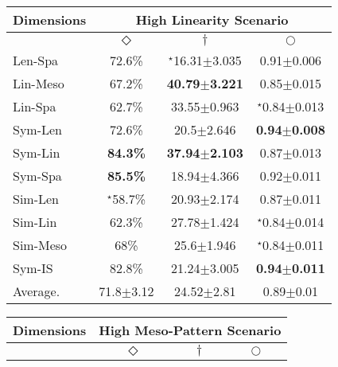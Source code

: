 \begin{table*}
\begin{subtable}[t]{0.48\textwidth}
\centering
\begin{tabular}{|l|ccc|}
\hline
Dimensions & \multicolumn{3}{c|}{High Linearity Scenario}                                  \\ \hline
        & \multicolumn{1}{c|}{$\Diamond$} & \multicolumn{1}{c|}{$\dagger$} & \multicolumn{1}{c|}{$\bigcirc$} \\ \hline
Len-Spa    & 72.6\%             & $^{\star}${16.31$\pm$3.035} & 0.91$\pm$0.006             \\ \hline
Lin-Meso   & 67.2\%             & \textbf{40.79$\pm$3.221}    & 0.85$\pm$0.015             \\ \hline
Lin-Spa    & 62.7\%             & 33.55$\pm$0.963             & $^{\star}${0.84$\pm$0.013} \\ \hline
Sym-Len    & 72.6\%             & 20.5$\pm$2.646              & \textbf{0.94$\pm$0.008}    \\ \hline
Sym-Lin & \textbf{84.3\%}                 & \textbf{37.94$\pm$2.103}       & 0.87$\pm$0.013                  \\ \hline
Sym-Spa    & \textbf{85.5\%}    & 18.94$\pm$4.366             & 0.92$\pm$0.011             \\ \hline
Sim-Len    & $^{\star}${58.7\%} & 20.93$\pm$2.174             & 0.87$\pm$0.011             \\ \hline
Sim-Lin    & 62.3\%             & 27.78$\pm$1.424             & $^{\star}${0.84$\pm$0.014} \\ \hline
Sim-Meso   & 68\%               & 25.6$\pm$1.946              & $^{\star}${0.84$\pm$0.011} \\ \hline
Sym-IS     & 82.8\%             & 21.24$\pm$3.005             & \textbf{0.94$\pm$0.011}    \\ \hline
Average.   & 71.8$\pm$3.12      & 24.52$\pm$2.81              & 0.89$\pm$0.01         
\\\hline
\end{tabular}%
\label{tab:table1_c}
\end{subtable}%
\hspace{\fill}%
\begin{subtable}[t]{0.48\textwidth}
\flushright
\centering
\begin{tabular}{|l|ccc|}
\hline
Dimensions & \multicolumn{3}{c|}{High Meso-Pattern Scenario}                                               \\ \hline
           & \multicolumn{1}{c|}{$\Diamond$} & \multicolumn{1}{c|}{$\dagger$} & $\bigcirc$                 \\ \hline

\end{tabular}
\end{subtable}
\end{table*}
